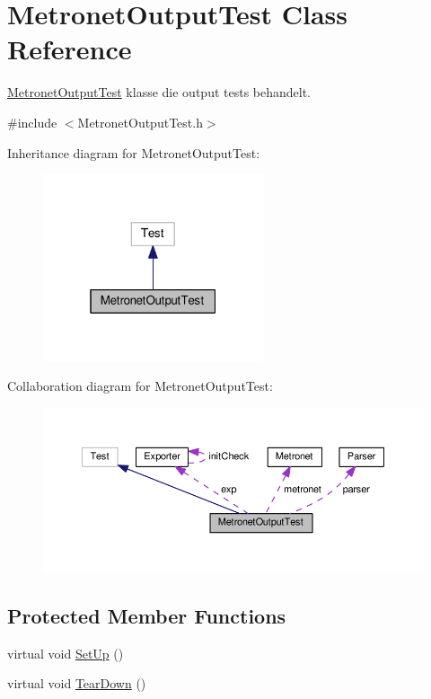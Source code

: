 \hypertarget{class_metronet_output_test}{}\section{Metronet\+Output\+Test Class Reference}
\label{class_metronet_output_test}


\hyperlink{class_metronet_output_test}{Metronet\+Output\+Test} klasse die output tests behandelt.  




{\ttfamily \#include $<$Metronet\+Output\+Test.\+h$>$}



Inheritance diagram for Metronet\+Output\+Test\+:
\nopagebreak
\begin{figure}[H]
\begin{center}
\leavevmode
\includegraphics[width=184pt]{class_metronet_output_test__inherit__graph}
\end{center}
\end{figure}


Collaboration diagram for Metronet\+Output\+Test\+:
\nopagebreak
\begin{figure}[H]
\begin{center}
\leavevmode
\includegraphics[width=350pt]{class_metronet_output_test__coll__graph}
\end{center}
\end{figure}
\subsection*{Protected Member Functions}
\begin{DoxyCompactItemize}
\item 
virtual void \hyperlink{class_metronet_output_test_a591685e65362fe63b325e2d33189a3b0}{Set\+Up} ()
\item 
virtual void \hyperlink{class_metronet_output_test_a1390ab64ffdb3c5da39c4b27b40c170a}{Tear\+Down} ()
\end{DoxyCompactItemize}
